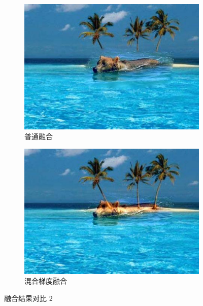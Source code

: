 \documentclass[11pt,a4paper]{article}
\begin{document}
		\begin{figure}[ht]
			\centering
			\begin{subfigure}[htbp]{0.36\textwidth}
				\includegraphics[width=\textwidth]{../../result/result_10.jpg}
				\caption{普通融合}
			\end{subfigure}
			\begin{subfigure}[htbp]{0.36\textwidth}
				\includegraphics[width=\textwidth]{../../result/result_11.jpg}
				\caption{混合梯度融合}
			\end{subfigure}
			\caption{融合结果对比 2}
		\end{figure}
\end{document}
